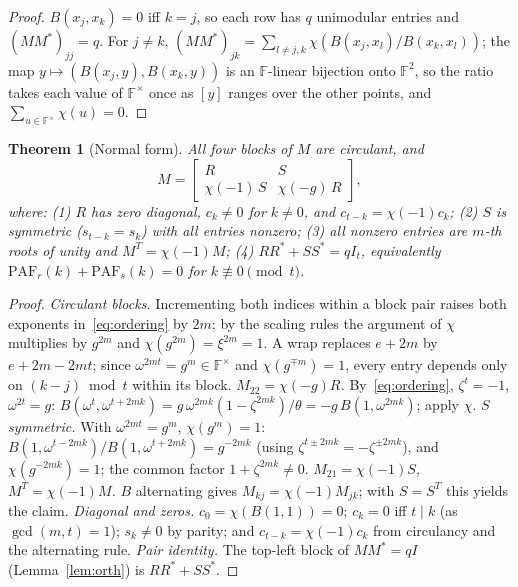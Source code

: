\documentclass[11pt]{article}
\theoremstyle{plain}
\newtheorem{theorem}{Theorem}[section]
\theoremstyle{definition}
\theoremstyle{remark}
\newcommand{\F}{\mathbb F}
\newcommand{\paf}{\mathrm{PAF}}
\begin{document}
\begin{proof}
$B(x_j,x_k)=0$ iff $k=j$, so each row has $q$ unimodular entries and
$(MM^*)_{jj}=q$. For $j\ne k$,
$(MM^*)_{jk}=\sum_{l\ne j,k}\chi(B(x_j,x_l)/B(x_k,x_l))$; the map
$y\mapsto(B(x_j,y),B(x_k,y))$ is an $\F$-linear bijection onto $\F^2$, so the
ratio takes each value of $\F^\times$ once as $[y]$ ranges over the other
points, and $\sum_{u\in\F^\times}\chi(u)=0$.
\end{proof}

\begin{theorem}[Normal form]\label{thm:normalform}
All four blocks of $M$ are circulant, and
\[
  M=\begin{bmatrix} R & S\\ \chi(-1)\,S & \chi(-g)\,R\end{bmatrix},
\]
where: \emph{(1)} $R$ has zero diagonal, $c_k\ne0$ for $k\ne0$, and
$c_{t-k}=\chi(-1)c_k$; \emph{(2)} $S$ is symmetric ($s_{t-k}=s_k$) with all
entries nonzero; \emph{(3)} all nonzero entries are $m$-th roots of unity and
$M^T=\chi(-1)M$; \emph{(4)} $RR^*+SS^*=qI_t$, equivalently
$\paf_r(k)+\paf_s(k)=0$ for $k\not\equiv0\pmod t$.
\end{theorem}

\begin{proof}
\emph{Circulant blocks.} Incrementing both indices within a block pair raises
both exponents in~\eqref{eq:ordering} by $2m$; by the scaling rules the argument
of $\chi$ multiplies by $g^{2m}$ and $\chi(g^{2m})=\xi^{2m}=1$. A wrap replaces
$e+2m$ by $e+2m-2mt$; since $\omega^{2mt}=g^m\in\F^\times$ and $\chi(g^{\mp m})=1$,
every entry depends only on $(k-j)\bmod t$ within its block.
\emph{$M_{22}=\chi(-g)R$.} By~\eqref{eq:ordering}, $\zeta^t=-1$, $\omega^{2t}=g$:
$B(\omega^t,\omega^{t+2mk})=g\,\omega^{2mk}(1-\zeta^{2mk})/\theta=-g\,B(1,\omega^{2mk})$;
apply $\chi$. \emph{$S$ symmetric.} With $\omega^{2mt}=g^m$, $\chi(g^m)=1$:
$B(1,\omega^{t-2mk})/B(1,\omega^{t+2mk})=g^{-2mk}$ (using
$\zeta^{t\pm2mk}=-\zeta^{\pm2mk}$), and $\chi(g^{-2mk})=1$; the common factor
$1+\zeta^{2mk}\ne0$. \emph{$M_{21}=\chi(-1)S$, $M^T=\chi(-1)M$.} $B$ alternating
gives $M_{kj}=\chi(-1)M_{jk}$; with $S=S^T$ this yields the claim. \emph{Diagonal
and zeros.} $c_0=\chi(B(1,1))=0$; $c_k=0$ iff $t\mid k$ (as $\gcd(m,t)=1$);
$s_k\ne0$ by parity; and $c_{t-k}=\chi(-1)c_k$ from circulancy and the
alternating rule. \emph{Pair identity.} The top-left block of $MM^*=qI$
(Lemma~\ref{lem:orth}) is $RR^*+SS^*$.
\end{proof}
\end{document}
